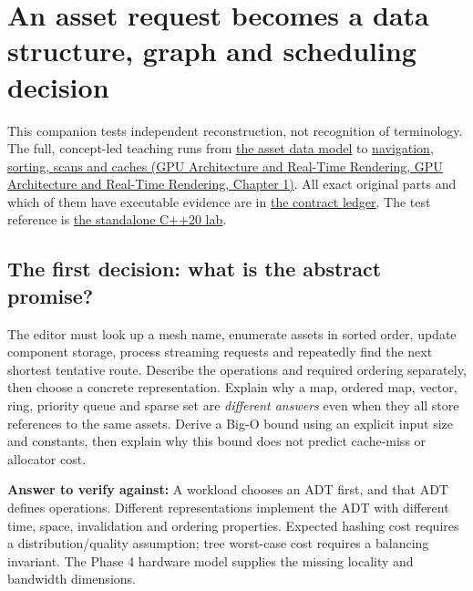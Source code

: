 \hypertarget{appendix-8a046b38375e}{}\label{referencestart:appendix-8a046b38375e}
\section{An asset request becomes a data structure, graph and scheduling decision}\label{appendix-8a046b38375e-an-asset-request-becomes-a-data-structure-graph-and-scheduling-decision}

This companion tests independent reconstruction, not recognition of terminology. The full, concept-led teaching runs from \hyperref[01-foundations-i-ch007-the-scene-is-now-too-large-for-the-wrong-container-phase-5-m025m027-parts-401445]{the asset data model} to \href{../06-GPU-Architecture-and-Real-Time-Rendering/main.pdf\#nameddest=01-foundations-i-ch008-from-an-asset-map-to-a-correct-navigable-world-phase-5-m028m030-parts-446500}{navigation, sorting, scans and caches (GPU Architecture and Real-Time Rendering, GPU Architecture and Real-Time Rendering, Chapter 1)}. All exact original parts and which of them have executable evidence are in \hyperref[appendix-fd090d982a15-phase-5-algorithms-and-data-structure-workload-contracts-parts-401500]{the contract ledger}. The test reference is \hyperref[source-file-0ec69e1a1a11439bca29faa5]{the standalone C++20 lab}.

\subsection{The first decision: what is the abstract promise?}\label{appendix-8a046b38375e-the-first-decision-what-is-the-abstract-promise}

The editor must look up a mesh name, enumerate assets in sorted order, update component storage, process streaming requests and repeatedly find the next shortest tentative route. Describe the operations and required ordering separately, then choose a concrete representation. Explain why a map, ordered map, vector, ring, priority queue and sparse set are \emph{different answers} even when they all store references to the same assets. Derive a Big-O bound using an explicit input size and constants, then explain why this bound does not predict cache-miss or allocator cost.

\textbf{Answer to verify against:} A workload chooses an ADT first, and that ADT defines operations. Different representations implement the ADT with different time, space, invalidation and ordering properties. Expected hashing cost requires a distribution/quality assumption; tree worst-case cost requires a balancing invariant. The Phase 4 hardware model supplies the missing locality and bandwidth dimensions.

